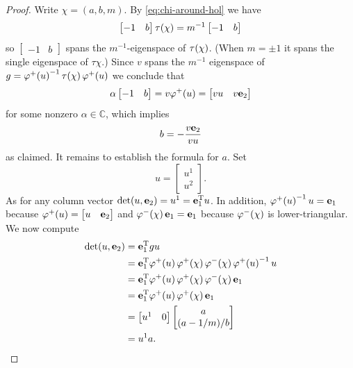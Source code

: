 \documentclass[leqno]{sl2art}
\begin{document}
\begin{proof}
  Write \(\chi = (a,b, m)\).
  By \cref{eq:chi-around-hol} we have
  \[
    \begin{bmatrix}
      -1 & b
    \end{bmatrix}
    \tau\mathopen{}\left(\chi\right)
    =
    m^{-1}
    \begin{bmatrix}
      -1 & b
    \end{bmatrix}
  \]
  so \(
    \begin{bmatrix}
      -1 & b
    \end{bmatrix}
  \)
  spans the \(m^{-1}\)-eigenspace of \(\tau\mathopen{}\left(\chi\right)\).
  (When \(m = \pm 1\) it spans the single eigenspace of \(\tau{\chi}\).)
  Since \(v\) spans the \(m^{-1}\) eigenspace of \(g = \varphi^+\mathopen{}\left(u\right)^{-1} \tau\mathopen{}\left(\chi\right) \varphi^+\mathopen{}\left(u\right)\) we conclude that
  \[
    \alpha
    \begin{bmatrix}
      -1 & b
    \end{bmatrix}
    =
    v
    \varphi^+\mathopen{}\left(u\right)
    =
    \begin{bmatrix}
      v u & v \mathrm{\mathbf{e}}_{2}
    \end{bmatrix}
  \]
  for some nonzero \(\alpha \in \mathbb{C}\), which implies
  \[
    b = -
    \frac{
      v \mathrm{\mathbf{e}}_{2}
      }{
      v u
    }
  \]
  as claimed.
  It remains to establish the formula for \(a\).
  Set
  \[
    u = \begin{bmatrix}
      u^1 \\ u^2
    \end{bmatrix}.
  \]
  As for any column vector \(\det(u, \mathrm{\mathbf{e}}_{2}) = u^1 = \mathrm{\mathbf{e}}_{1}^{\mathrm{T}} u\).
  In addition,
  \(
    \varphi^+\mathopen{}\left(u\right)^{-1} u =  \mathrm{\mathbf{e}}_{1}
  \)
  because
  \(
    \varphi^+\mathopen{}\left(u\right) = \begin{bmatrix}
      u & \mathrm{\mathbf{e}}_{2}
    \end{bmatrix}
  \)
  and \(\varphi^-\mathopen{}\left(\chi\right) \mathrm{\mathbf{e}}_{1} = \mathrm{\mathbf{e}}_{1}\) because \(\varphi^-\mathopen{}\left(\chi\right)\) is lower-triangular.
  We now compute
  \begin{align*}
    \det(u, \mathrm{\mathbf{e}}_{2}) 
    &=
    \mathrm{\mathbf{e}}_{1}^{\mathrm{T}}
    g u
    \\
    &=
    \mathrm{\mathbf{e}}_{1}^{\mathrm{T}}
    \varphi^+\mathopen{}\left(u\right) \varphi^+\mathopen{}\left(\chi\right) \varphi^-\mathopen{}\left(\chi\right) \varphi^+\mathopen{}\left(u\right)^{-1} u 
    \\
    &=
    \mathrm{\mathbf{e}}_{1}^{\mathrm{T}}
    \varphi^+\mathopen{}\left(u\right) \varphi^+\mathopen{}\left(\chi\right) \varphi^-\mathopen{}\left(\chi\right) \mathrm{\mathbf{e}}_{1}
    \\
    &=
    \mathrm{\mathbf{e}}_{1}^{\mathrm{T}}
    \varphi^+\mathopen{}\left(u\right) \varphi^+\mathopen{}\left(\chi\right) \mathrm{\mathbf{e}}_{1}
    \\
    &=
    \begin{bmatrix}
      u^1 & 0 
    \end{bmatrix}
    \begin{bmatrix}
      a \\
      (a-1/m)/b
    \end{bmatrix}
    \\
    &= u^1 a.
  \end{align*}
\end{proof}
\end{document}
